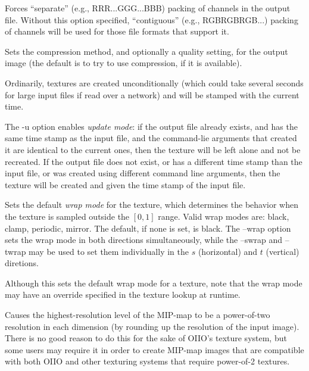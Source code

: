 Forces ``separate'' (e.g., RRR...GGG...BBB) packing of channels in the
output file.  Without this option specified, ``contiguous'' (e.g.,
RGBRGBRGB...) packing of channels will be used for those file formats
that support it.
\apiend

Sets the compression method, and optionally a quality setting,
for the output image (the default is to try
to use  compression, if it is available).
\apiend

Ordinarily, textures are created unconditionally (which could take
several seconds for large input files if read over a network) and will
be stamped with the current time.

The {\cf -u} option enables \emph{update mode}: if the output file
already exists, and has the same time stamp as the input file, and
the command-lie arguments that created it are identical to the
current ones, then the texture will be left alone and not be recreated.
If the output file does not exist, or has
a different time stamp than the input file, or was created using different
command line arguments, then the texture will be created
and given the time stamp of the input file.
\apiend

Sets the default \emph{wrap mode} for the texture, which determines
the behavior when the texture is sampled outside the $[0,1]$ range.
Valid wrap modes are: {\cf black}, {\cf clamp}, {\cf periodic},
{\cf mirror}.  The default, if none is set, is {\cf black}.  The
{\cf --wrap} option sets the wrap mode in both directions
simultaneously, while the {\cf --swrap} and {\cf --twrap} may be used to
set them individually in the $s$ (horizontal) and $t$ (vertical)
diretions.

Although this sets the default wrap mode for a texture, note that
the wrap mode may have an override specified in the texture lookup
at runtime.
\apiend

Causes the highest-resolution level of the MIP-map to be a
power-of-two resolution in each dimension
(by rounding up the resolution of the input image).  There is no
good reason to do this for the sake of OIIO's texture system, but 
some users may require it in order to create MIP-map images
that are compatible with both OIIO and other texturing systems that
require power-of-2 textures.
\apiend

